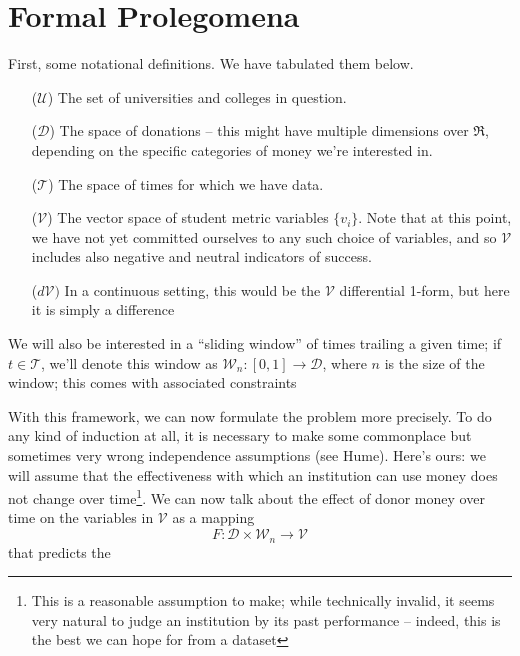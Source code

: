 \documentclass[paper.tex]{subfiles}
\newcommand{\U}{\mathcal{U}}
\newcommand{\D}{\mathcal{D}}
\newcommand{\V}{\mathcal{V}}
\newcommand{\T}{\mathcal{T}}
\newcommand{\W}{\mathcal{W}}
\begin{document}
	\section{Formal Prolegomena}
	
	First, some notational definitions. We have tabulated them below. 
	
	\begin{itemize}
		\item[($\U$)] The set of universities and colleges in question.
		\item[($\D$)] The space of donations -- this might have multiple dimensions over $\Re$, depending on the specific categories of money we're interested in. 
		\item[($\T$)] The space of times for which we have data. 
		\item[($\V$)] The vector space of student metric variables $\{v_i\}$. Note that at this point, we have not yet committed ourselves to any such choice of variables, and so $\V$ includes also negative and neutral indicators of success.
		\item[($d\V)$] In a continuous setting, this would be the $\V$ differential 1-form, but here it is simply a difference 
	\end{itemize}
	
	We will also be interested in a ``sliding window'' of times trailing a given time; if $t \in \T$, we'll denote this window as $\W_n : [0,1] \to \D$, where $n$ is the size of the window; this comes with associated constraints 
	
	With this framework, we can now formulate the problem more precisely. To do any kind of induction at all, it is necessary to make some commonplace but sometimes very wrong independence assumptions (see Hume). Here's ours: we will assume that the effectiveness with which an institution can use money does not change over time\footnote{This is a reasonable assumption to make; while technically invalid, it seems very natural to judge an institution by its past performance -- indeed, this is the best we can hope for from a dataset}. We can now talk about the effect of donor money over time on the variables in $\V$ as a mapping
	\begin{equation}
		F: \D \times \W_n \to \V
	\end{equation} 	
	that predicts the 
\end{document}

